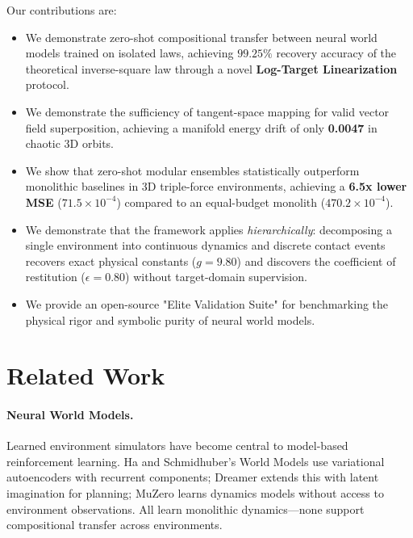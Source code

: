 \documentclass[twoside,11pt]{article}
\begin{document}
Our contributions are:
\begin{itemize}
    \item We demonstrate zero-shot compositional transfer between neural world models trained on isolated laws, achieving $99.25\%$ recovery accuracy of the theoretical inverse-square law through a novel \textbf{Log-Target Linearization} protocol.
    \item We demonstrate the sufficiency of tangent-space mapping for valid vector field superposition, achieving a manifold energy drift of only \textbf{0.0047} in chaotic 3D orbits.
    \item We show that zero-shot modular ensembles statistically outperform monolithic baselines in 3D triple-force environments, achieving a \textbf{6.5x lower MSE} ($71.5 \times 10^{-4}$) compared to an equal-budget monolith ($470.2 \times 10^{-4}$).
    \item We demonstrate that the framework applies \emph{hierarchically}: decomposing a single environment into continuous dynamics and discrete contact events recovers exact physical constants ($g=9.80$) and discovers the coefficient of restitution ($\epsilon=0.80$) without target-domain supervision.
    \item We provide an open-source "Elite Validation Suite" for benchmarking the physical rigor and symbolic purity of neural world models.
\end{itemize}

\section{Related Work}
\label{sec:related}

\paragraph{Neural World Models.}
Learned environment simulators have become central to model-based reinforcement learning. Ha and Schmidhuber's World Models \citep{ha2018worldmodels} use variational autoencoders with recurrent components; Dreamer \citep{hafner2020dreamer} extends this with latent imagination for planning; MuZero \citep{schrittwieser2020muzero} learns dynamics models without access to environment observations. All learn monolithic dynamics—none support compositional transfer across environments.
\end{document}
